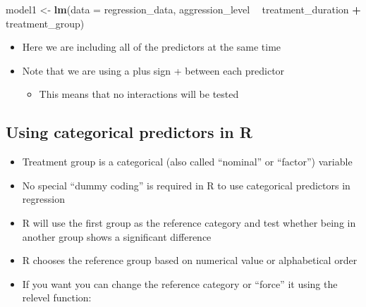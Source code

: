\documentclass[
]{book}
\newenvironment{Shaded}{\begin{snugshade}}{\end{snugshade}}
\newcommand{\DataTypeTok}[1]{\textcolor[rgb]{0.13,0.29,0.53}{#1}}
\newcommand{\KeywordTok}[1]{\textcolor[rgb]{0.13,0.29,0.53}{\textbf{#1}}}
\newcommand{\NormalTok}[1]{#1}
\newcommand{\OperatorTok}[1]{\textcolor[rgb]{0.81,0.36,0.00}{\textbf{#1}}}
\newcommand{\StringTok}[1]{\textcolor[rgb]{0.31,0.60,0.02}{#1}}
\providecommand{\tightlist}{%
  \setlength{\itemsep}{0pt}\setlength{\parskip}{0pt}}
\begin{document}
\begin{Shaded}
\begin{Highlighting}[]
\NormalTok{model1 <-}\StringTok{ }\KeywordTok{lm}\NormalTok{(}\DataTypeTok{data =}\NormalTok{ regression_data, aggression_level }\OperatorTok{~}\StringTok{ }\NormalTok{treatment_duration }\OperatorTok{+}\StringTok{ }\NormalTok{treatment_group)}
\end{Highlighting}
\end{Shaded}

\begin{itemize}
\tightlist
\item
  Here we are including all of the predictors at the same time
\item
  Note that we are using a plus sign + between each predictor

  \begin{itemize}
  \tightlist
  \item
    This means that no interactions will be tested
  \end{itemize}
\end{itemize}

\hypertarget{using-categorical-predictors-in-r}{%
\subsection{Using categorical predictors in R}\label{using-categorical-predictors-in-r}}

\begin{itemize}
\tightlist
\item
  Treatment group is a categorical (also called ``nominal'' or ``factor'') variable
\item
  No special ``dummy coding'' is required in R to use categorical predictors in regression
\item
  R will use the first group as the reference category and test whether being in another group shows a significant difference
\item
  R chooses the reference group based on numerical value or alphabetical order
\item
  If you want you can change the reference category or ``force'' it using the relevel function:
\end{itemize}

\begin{Shaded}
\end{Shaded}
\end{document}
